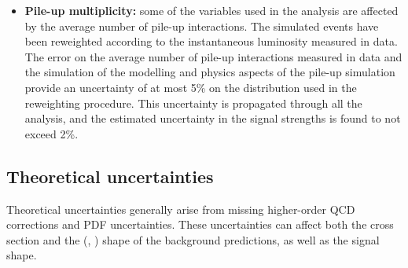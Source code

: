 \begin{itemize}
\item {\bf Pile-up multiplicity:} 
some of the variables used in the analysis are affected by the average number of pile-up interactions. The simulated events have been reweighted according to the instantaneous luminosity measured in data. The error on the average number of pile-up interactions measured in data and the simulation of the modelling and physics aspects of the pile-up simulation provide an uncertainty of at most 5\% on the distribution used in the reweighting procedure. This uncertainty is propagated through all the analysis, and the estimated uncertainty in the signal strengths is found to not exceed 2\%.
\end{itemize}

\subsection{Theoretical uncertainties \label{subsec:thsyst}}

Theoretical uncertainties generally arise from missing higher-order QCD corrections and PDF uncertainties. These uncertainties can affect both the cross section and the (\mll, \mt) shape of the background predictions, as well as the signal shape.

